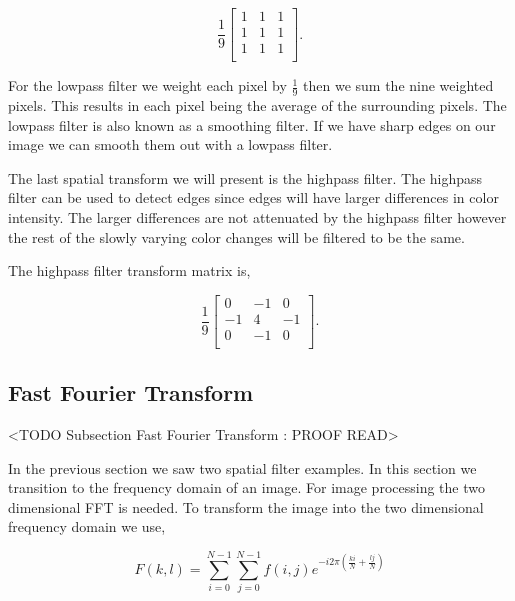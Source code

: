 \begin{equation}
\frac{1}{9}\begin{bmatrix}
1 & 1 & 1\\
1 & 1 & 1\\
1 & 1 & 1\\
\end{bmatrix}.
\end{equation}

For the lowpass filter we weight each pixel by $\frac{1}{9}$ then we sum the nine weighted pixels. This results in each pixel being the average of the surrounding pixels. The lowpass filter is also known as a smoothing filter. If we have sharp edges on our image we can smooth them out with a lowpass filter. 

The last spatial transform we will present is the highpass filter. The highpass filter can be used to detect edges since edges will have larger differences in color intensity. The larger differences are not attenuated by the highpass filter however the rest of the slowly varying color changes will be filtered to be the same.

The highpass filter transform matrix is,

\begin{equation}
\frac{1}{9}\begin{bmatrix}
0 & -1 & 0\\
-1 & 4 & -1\\
0 & -1 & 0\\
\end{bmatrix}.
\end{equation}

\cite{image processing book}	
	
\subsection{Fast Fourier Transform}
	<TODO Subsection Fast Fourier Transform : PROOF READ>
	
In the previous section we saw two spatial filter examples. In this section we transition to the frequency domain of an image. For image processing the two dimensional \ac{FFT} is needed. To transform the image into the two dimensional frequency domain we use,

\begin{equation}
F\left(k,l\right)=\sum_{i=0}^{N-1}\sum_{j=0}^{N-1}f\left(i,j\right)e^{-i2\pi\left(\frac{ki}{N}+\frac{lj}{N}\right)}
\end{equation}

